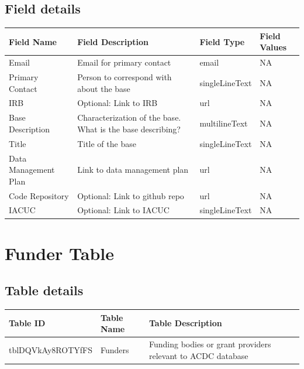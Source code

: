\documentclass[
]{book}
\begin{document}
\hypertarget{field-details}{%
\subsection{Field details}\label{field-details}}

\begin{table}
\centering
\begin{tabular}{l|l|l|l}
\hline
\textbf{Field Name} & \textbf{Field Description} & \textbf{Field Type} & \textbf{Field Values}\\
\hline
Email & Email for primary contact & email & NA\\
\hline
Primary Contact & Person to correspond with about the base & singleLineText & NA\\
\hline
IRB & Optional: Link to IRB & url & NA\\
\hline
Base Description & Characterization of the base. What is the base describing? & multilineText & NA\\
\hline
Title & Title of the base & singleLineText & NA\\
\hline
Data Management Plan & Link to data management plan & url & NA\\
\hline
Code Repository & Optional: Link to github repo & url & NA\\
\hline
IACUC & Optional: Link to IACUC & singleLineText & NA\\
\hline
\end{tabular}
\end{table}

\hypertarget{funders-table}{%
\section{Funder Table}\label{funders-table}}

\hypertarget{table-details-4}{%
\subsection{Table details}\label{table-details-4}}

\begin{table}
\centering
\begin{tabular}{l|l|l}
\hline
\textbf{Table ID} & \textbf{Table Name} & \textbf{Table Description}\\
\hline
tblDQVkAy8ROTYfFS & Funders & Funding bodies or grant providers relevant to ACDC database\\
\hline
\end{tabular}
\end{table}
\end{document}
